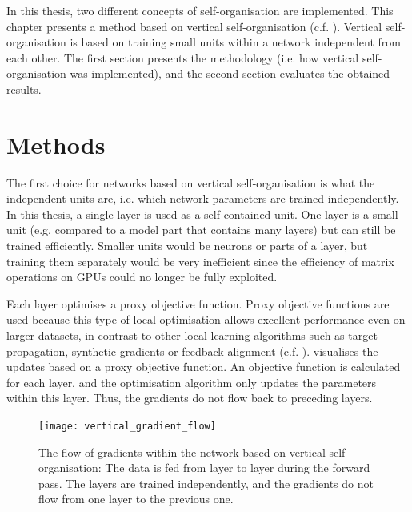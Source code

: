 In this thesis, two different concepts of self-organisation are implemented.
This chapter presents a method based on vertical self-organisation (c.f. ).
Vertical self-organisation is based on training small units within a network independent from each other.
The first section presents the methodology (i.e. how vertical self-organisation was implemented), and the second section evaluates the obtained results.


\section{Methods}
The first choice for networks based on vertical self-organisation is what the independent units are, i.e. which network parameters are trained independently.
In this thesis, a single layer is used as a self-contained unit. One layer is a small unit (e.g. compared to a model part that contains many layers) but can still be trained efficiently.
Smaller units would be neurons or parts of a layer, but training them separately would be very inefficient since the efficiency of matrix operations on GPUs could no longer be fully exploited.

Each layer optimises a proxy objective function.
Proxy objective functions are used because this type of local optimisation allows excellent performance even on larger datasets, in contrast to other local learning algorithms such as target propagation, synthetic gradients or feedback alignment (c.f. ). 
  visualises the updates based on a proxy objective function.
An objective function is calculated for each layer, and the optimisation algorithm only updates the parameters within this layer.
Thus, the gradients do not flow back to preceding layers.

\begin{figure}[h]
    \centering
    \texttt{[image: vertical\_gradient\_flow]}
    \caption[The flow of gradients within the network based on vertical self-organisation]{The flow of gradients within the network based on vertical self-organisation: The data is fed from layer to layer during the forward pass. The layers are trained independently, and the gradients do not flow from one layer to the previous one.}
\end{figure}

